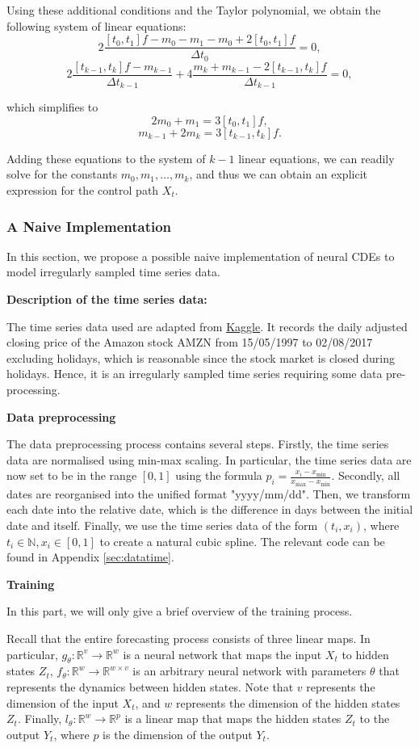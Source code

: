 \documentclass[a4paper,11pt,titlepage]{article}
\theoremstyle{definition}
\theoremstyle{plain}
\theoremstyle{remark}
\begin{document}
Using these additional conditions and the Taylor polynomial, we obtain the following system of linear equations:
$$2\frac{[t_0,t_1]f-m_0-m_1-m_0+2[t_0,t_1]f}{\Delta t_0}=0,$$
$$2\frac{[t_{k-1},t_k]f-m_{k-1}}{\Delta t_{k-1}}+4\frac{m_k+m_{k-1}-2[t_{k-1},t_k]f}{\Delta t_{k-1}}=0,$$

which simplifies to
$$2m_0+m_1=3[t_0,t_1]f,$$
$$m_{k-1}+2m_k=3[t_{k-1},t_k]f.$$

Adding these equations to the system of $k-1$ linear equations, we can readily solve for the constants $m_0,m_1,\dots,m_k$, and thus we can obtain an explicit expression for the control path $X_t$. 

\subsubsection{A Naive Implementation}
\label{sec:implementation}

In this section, we propose a possible naive implementation of neural CDEs to model irregularly sampled time series data.

\textbf{Description of the time series data:}

The time series data used are adapted from \href{https://www.kaggle.com/datasets/praxitelisk/financial-time-series-datasets}{Kaggle}. It records the daily adjusted closing price of the Amazon stock AMZN from 15/05/1997 to 02/08/2017 excluding holidays, which is reasonable since the stock market is closed during holidays. Hence, it is an irregularly sampled time series requiring some data pre-processing.

\textbf{Data preprocessing}

The data preprocessing process contains several steps. Firstly, the time series data are normalised using min-max scaling. In particular, the time series data are now set to be in the range $[0,1]$ using the formula $p_i=\frac{x_i-x_{\min}}{x_{\max}-x_{\min}}$. Secondly, all dates are reorganised into the unified format "yyyy/mm/dd". Then, we transform each date into the relative date, which is the difference in days between the initial date and itself. Finally, we use the time series data of the form $(t_i,x_i)$, where $t_i\in\mathbb{N}, x_i\in[0,1]$ to create a natural cubic spline. The relevant code can be found in Appendix \ref{sec:datatime}.

\textbf{Training}

In this part, we will only give a brief overview of the training process.

Recall that the entire forecasting process consists of three linear maps. In particular, $g_\theta:\mathbb{R}^v\rightarrow\mathbb{R}^w$ is a neural network that maps the input $X_t$ to hidden states $Z_t$, $f_\theta:\mathbb{R}^w\rightarrow\mathbb{R}^{w\times v}$ is an arbitrary neural network with parameters $\theta$ that represents the dynamics between hidden states. Note that $v$ represents the dimension of the input $X_t$, and $w$ represents the dimension of the hidden states $Z_t$. Finally, $l_\theta:\mathbb{R}^w\rightarrow\mathbb{R}^p$ is a linear map that maps the hidden states $Z_t$ to the output $Y_t$, where $p$ is the dimension of the output $Y_t$.
\end{document}
